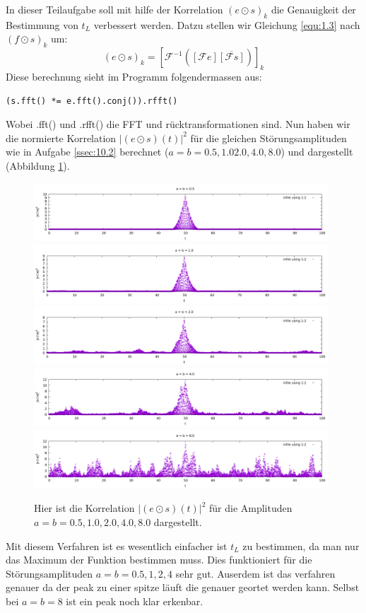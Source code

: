 \documentclass[ngerman]{scrartcl}
\begin{document}
In dieser Teilaufgabe soll mit hilfe der Korrelation $(e \odot s)_k$
die Genauigkeit der Bestimmung von $t_L$ verbessert werden.
Datzu stellen wir Gleichung \ref{equ:1.3} nach $(f \odot s)_k$ um:
\begin{equation*}
	(e \odot s)_{k}=\left[\mathcal{F}^{-1}\left( [\mathcal{F} e] \overline{[\mathcal{F} s]}\right)\right]_{k}
\end{equation*}
Diese berechnung sieht im Programm folgendermassen aus:
\begin{lstlisting}[style=CStyle]
	(s.fft() *= e.fft().conj()).rfft()
\end{lstlisting}
Wobei .fft() und .rfft() die FFT und r\"ucktransformationen sind.
Nun haben wir die normierte Korrelation $|(e \odot s)(t)|^{2}$ für die gleichen Störungsamplituden wie in Aufgabe \ref{ssec:10.2} berechnet ($a=b=0.5,1.0 2.0, 4.0, 8.0$) und dargestellt (Abbildung \ref{fig:3.1}).
\begin{figure}[htbp]
	\centering
	\includegraphics[width=0.98\textwidth]{plots/korrelation/0.5}
	\includegraphics[width=0.98\textwidth]{plots/korrelation/1.0}
	\includegraphics[width=0.98\textwidth]{plots/korrelation/2.0}
	\includegraphics[width=0.98\textwidth]{plots/korrelation/4.0}
	\includegraphics[width=0.98\textwidth]{plots/korrelation/8.0}
	\caption[$|(e \odot s)(t)|^2$]{Hier ist die Korrelation $|(e \odot s)(t)|^2$ für die Amplituden $a=b=0.5, 1.0, 2.0, 4.0, 8.0$ dargestellt.}
	\label{fig:3.1}
\end{figure} 
Mit diesem Verfahren ist es wesentlich einfacher ist $t_L$ zu bestimmen,
da man nur das Maximum der Funktion bestimmen muss.
Dies funktioniert für die Störungsamplituden $a=b=0.5,1,2,4$ sehr gut.
Auserdem ist das verfahren genauer da der peak zu einer spitze l\"auft
die genauer geortet werden kann.
Selbst bei $a=b=8$ ist ein peak noch klar erkenbar. 
\newpage
\end{document}

